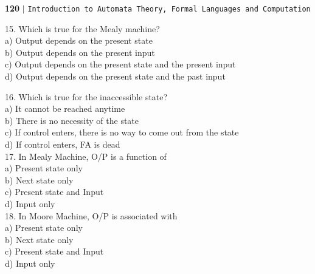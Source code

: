 \documentclass{article}
\begin{document}
\begin{flushleft}
    \textbf{120}\hspace*{0.1cm} \textbf{$|$} \hspace*{0.1cm} \texttt{Introduction to Automata Theory, Formal Languages and Computation}
  \end{flushleft}

\vspace*{0.3cm}
15. Which is true for the Mealy machine?\\
\hspace*{0.5cm} a) Output depends on the present state \\
\hspace*{0.5cm} b) Output depends on the present input \\
\hspace*{0.5cm} c) Output depends on the present state and the present input\\
\hspace*{0.5cm} d) Output depends on the present state and the past input\\

\vspace*{0.2cm}

16. Which is true for the inaccessible state?\\
\hspace*{0.5cm} a) It cannot be reached anytime \\
\hspace*{0.5cm} b) There is no necessity of the state \\
\hspace*{0.5cm} c) If control enters, there is no way to come out from the state \\
\hspace*{0.5cm} d) If control enters, FA is dead \\

\vspace*{0.2cm}
17. In Mealy Machine, O/P is a function of \\
\hspace*{0.5cm} a) Present state only\\
\hspace*{0.5cm} b) Next state only\\
\hspace*{0.5cm} c) Present state and Input\\
\hspace*{0.5cm} d) Input only\\

\vspace*{0.2cm}
18. In Moore Machine, O/P is associated with \\
\hspace*{0.5cm} a) Present state only \\
\hspace*{0.5cm} b) Next state only \\
\hspace*{0.5cm} c) Present state and Input \\
\hspace*{0.5cm} d) Input only \\
\end{document}
